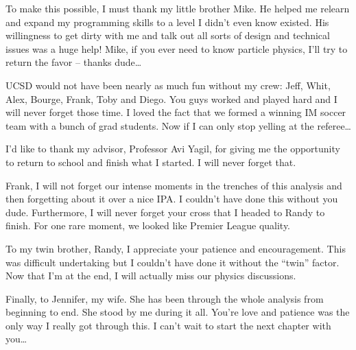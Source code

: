 \begin{frontmatter}
\begin{acknowledgements}
To make this possible, I must thank my little brother Mike. He helped me
relearn and expand my programming skills to a level I didn't even know existed.
His willingness to get dirty with me and talk out all sorts of design and
technical issues was a huge help! Mike, if you ever need to know particle
physics, I'll try to return the favor -- thanks dude\ldots

UCSD would not have been nearly as much fun without my crew: Jeff, Whit, Alex,
Bourge, Frank, Toby and Diego. You guys worked and played hard and I will never
forget those time. I loved the fact that we formed a winning IM soccer team
with a bunch of grad students. Now if I can only stop yelling at the referee\ldots

I'd like to thank my advisor, Professor Avi Yagil, for giving me the opportunity to
return to school and finish what I started. I will never forget that.

Frank, I will not forget our intense moments in the trenches of this analysis
and then forgetting about it over a nice IPA. I couldn't have done this without
you dude. Furthermore, I will never forget your cross that I headed to Randy to
finish. For one rare moment, we looked like Premier League quality.

To my twin brother, Randy, I appreciate your patience and encouragement. This
was difficult undertaking but I couldn't have done it without the ``twin''
factor. Now that I'm at the end, I will actually miss our physics discussions.

Finally, to Jennifer, my wife. She has been through the whole analysis from
beginning to end. She stood by me during it all. You're love and patience was
the only way I really got through this. I can't wait to start the next chapter
with you\ldots
\end{acknowledgements}                                                         


\end{frontmatter}
